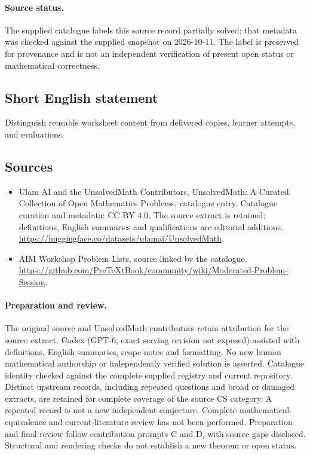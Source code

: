 \documentclass[11pt]{article}
\begin{document}
\paragraph{Source status.}
The supplied catalogue labels this source record partially solved; that metadata was checked against the supplied snapshot on 2026-10-11. The label is preserved for provenance and is not an independent verification of present open status or mathematical correctness.
\subsection{Short English statement}
Distinguish reusable worksheet content from delivered copies, learner attempts, and evaluations.
\subsection{Sources}
\begin{itemize}
\item[\hypertarget{source:statement:1}{S1}] Ulam AI and the UnsolvedMath Contributors, UnsolvedMath: A Curated Collection of Open Mathematics Problems, catalogue entry. Catalogue curation and metadata: CC BY 4.0. The source extract is retained; definitions, English summaries and qualifications are editorial additions.
\url{https://huggingface.co/datasets/ulamai/UnsolvedMath}.
\item[\hypertarget{source:statement:2}{S2}] AIM Workshop Problem Lists, source linked by the catalogue.
\url{https://github.com/PreTeXtBook/community/wiki/Moderated-Problem-Session}.
\end{itemize}
\paragraph{Preparation and review.}
The original source and UnsolvedMath contributors retain attribution for the source extract. Codex (GPT-6; exact serving revision not exposed) assisted with definitions, English summaries, scope notes and formatting. No new human mathematical authorship or independently verified solution is asserted. Catalogue identity checked against the complete supplied registry and current repository. Distinct upstream records, including repeated questions and broad or damaged extracts, are retained for complete coverage of the source CS category. A repeated record is not a new independent conjecture. Complete mathematical-equivalence and current-literature review has not been performed. Preparation and final review follow contribution prompts C and D, with source gaps disclosed. Structural and rendering checks do not establish a new theorem or open status.
\label{end:statement}
\end{document}
